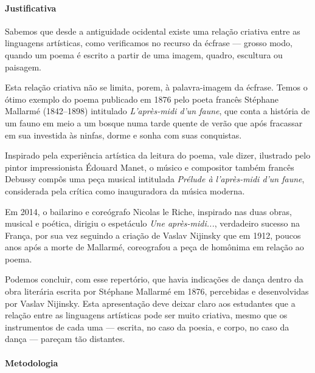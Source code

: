 \documentclass[12pt]{extarticle}
\begin{document}
\paragraph{Justificativa} Sabemos que desde a antiguidade ocidental existe
uma relação criativa entre as linguagens artísticas, como verificamos
no recurso da écfrase --- grosso modo, quando um poema é escrito 
a partir de uma imagem, quadro, escultura ou paisagem. 

Esta relação criativa não se limita, porem, à palavra-imagem da écfrase. 
Temos o ótimo exemplo do poema publicado em 1876 pelo poeta francês Stéphane Mallarmé (1842--1898) intitulado
\textit{L'après-midi d'un faune}, que conta a história de um fauno em meio
a um bosque numa tarde quente de verão que após fracassar em sua investida
às ninfas, dorme e sonha com suas conquistas. 

Inspirado pela experiência artística da leitura do poema, vale dizer, ilustrado 
pelo pintor impressionista Édouard Manet, o músico e compositor também
francês Debussy compôs uma peça musical intitulada \textit{Prélude à l'après-midi
d'un faune}, considerada pela crítica como inauguradora da música moderna. 

Em 2014, o bailarino e coreógrafo Nicolas le Riche, inspirado nas duas obras,
musical e poética, dirigiu o espetáculo \textit{Une après-midi...}, verdadeiro 
sucesso na França, por sua vez seguindo a criação de Vaslav Nijinsky
que em 1912, poucos anos após a morte de Mallarmé, coreografou a peça de homônima
em relação ao poema. 

Podemos concluir, com esse repertório, que havia indicações de dança dentro da
obra literária escrita por Stéphane Mallarmé em 1876, percebidas e desenvolvidas
por Vaslav Nijinsky. Esta apresentação deve deixar
claro aos estudantes que a relação entre as linguagens artísticas pode
ser muito criativa, mesmo que os instrumentos de cada uma --- escrita, no caso
da poesia, e corpo, no caso da dança --- pareçam tão distantes.

\paragraph{Metodologia}
\end{document}
